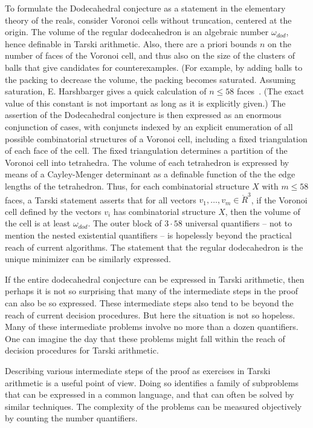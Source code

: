 \documentclass{article} %
\begin{document}
To formulate the Dodecahedral conjecture as a statement in the
elementary theory of the reals, consider Voronoi cells without
truncation, centered at the origin. The volume of the regular
dodecahedron is an algebraic number $\omega_{dod}$, hence definable in
Tarski arithmetic. Also, there are a priori bounds $n$ on the number
of faces of the Voronoi cell, and thus also on the size of the
clusters of balls that give candidates for counterexamples. (For
example, by adding balls to the packing to decrease the volume, the
packing becomes saturated. Assuming saturation, E. Harshbarger gives a
quick calculation of $n\le58$ faces~\cite{website:HarsbargerVoronoi}.
(The exact value of this constant is not important as long as it is
explicitly given.) The assertion of the Dodecahedral conjecture is
then expressed as an enormous conjunction of cases, with conjuncts
indexed by an explicit enumeration of all possible combinatorial
structures of a Voronoi cell, including a fixed triangulation of each
face of the cell. The fixed triangulation determines a partition of
the Voronoi cell into tetrahedra. The volume of each tetrahedron is
expressed by means of a Cayley-Menger determinant as a definable
function of the the edge lengths of the tetrahedron. Thus, for each
combinatorial structure $X$ with $m\le 58$ faces, a Tarski statement
asserts that for all vectors $v_1,\ldots,v_m\in\ring{R}^3$, if the
Voronoi cell defined by the vectors $v_i$ has combinatorial structure
$X$, then the volume of the cell is at least $\omega_{dod}$. The outer
block of $3\cdot 58$ universal quantifiers -- not to mention the
nested existential quantifiers -- is hopelessly beyond the practical
reach of current algorithms. The statement that the regular
dodecahedron is the unique minimizer can be similarly expressed.

If the entire dodecahedral conjecture can be expressed
in Tarski arithmetic, then perhaps it is not so surprising that
many of the intermediate steps in the proof can also be so expressed.
These intermediate steps also tend to be beyond the reach of
current decision procedures.  
But here the situation is not so hopeless.  Many of these
intermediate problems involve no more than a dozen quantifiers.
One can imagine the day that these problems might fall within the
reach of decision procedures for Tarski arithmetic.

Describing various intermediate steps 
of the proof as exercises
in Tarski arithmetic is a useful point of view.  Doing so identifies
a family of subproblems that can be expressed in a common language,
and that can often be solved by similar techniques.  
The complexity of the
problems can be measured objectively by counting the number
quantifiers.
\end{document}
